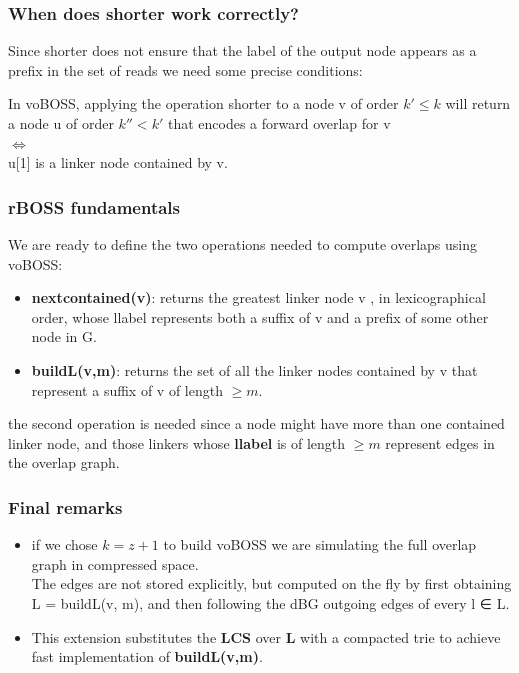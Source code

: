 \begin{frame}
\frametitle{When does shorter work correctly?}
Since shorter does not ensure that the label of the output node appears as a prefix in the set of reads we need some precise conditions:
\begin{lemma}
	In voBOSS, applying the operation shorter to a node v of order $k' \leq k$ will
	return a node u of order $k'' < k'$ that encodes a forward overlap for v \\
	$\Leftrightarrow$\\
	u[1] is a linker node contained by v.
\end{lemma}
\end{frame}

\begin{frame}
\frametitle{rBOSS fundamentals}
We are ready to define the two operations needed to compute overlaps using voBOSS:
\begin{itemize}
	\item \textbf{nextcontained(v)}: returns the greatest linker node v , in lexicographical order, whose llabel represents both a suffix of v and a prefix of some other node in G.
	\item \textbf{buildL(v,m)}: returns the set of all the linker nodes contained by v that represent a suffix of v
	of length $\geq m$.
\end{itemize}
the second operation is needed since a node might have more than one contained linker node, and those linkers whose \textbf{llabel} is of length $\geq m$ represent edges in the overlap graph.
\end{frame}

\begin{frame}
\frametitle{Final remarks}
\begin{itemize}
	\item if we chose $k = z + 1$ to build voBOSS we are simulating the full overlap graph in compressed space.\\
	The edges are not stored explicitly, but computed on the
	fly by first obtaining L = buildL(v, m), and then following the dBG outgoing edges of every l ∈ L.
	\item This extension substitutes the \textbf{LCS} over \textbf{L} with a compacted trie to achieve fast implementation of \textbf{buildL(v,m)}.
	
\end{itemize}

\end{frame}

